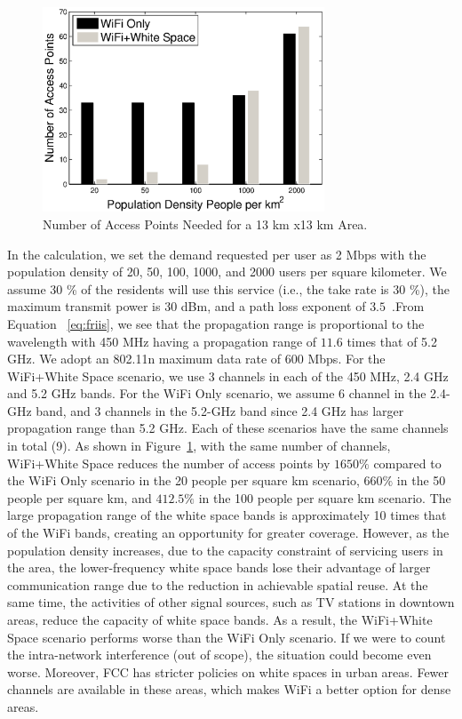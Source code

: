   \begin{figure}
   \centering
   \includegraphics[width=84mm]{figures/redensity}
   \vspace{-0.1in}
   \caption{Number of Access Points Needed for a 13 km x13 km Area.}
   \label{fig:redensity}
   \vspace{-0.3in}
   \end{figure}

In the calculation, we set the demand requested per user as 2 Mbps with the population density of 20, 50, 100, 1000, 
and 2000 users per square kilometer. We assume 30 \% of the residents will use this service (i.e., the take rate is 
30 \%), the maximum transmit power is 30 dBm, and a path loss exponent of $3.5$~\cite{meikle2012global}.From Equation
~\ref{eq:friis}, we see that the propagation range is proportional to the wavelength with 450 MHz having a propagation 
range of $11.6$ times that of 5.2 GHz. We adopt an 802.11n maximum data rate of 600 Mbps. For the WiFi+White Space 
scenario, we use 3 channels in each of the 450 MHz, 2.4 GHz and 5.2 GHz bands. For the WiFi Only scenario, we assume 
6 channel in the 2.4-GHz band, and 3 channels in the 5.2-GHz band since 2.4 GHz has larger propagation range than 5.2 GHz. 
Each of these scenarios have the same channels in total (9). As shown in Figure~\ref{fig:redensity}, with the same number 
of channels, WiFi+White Space reduces the number of access points by $1650\%$ compared to the WiFi Only scenario in the 
20 people per square km scenario, $660\%$ in the 50 people per square km, and $412.5\%$ in the 100 people per square km 
scenario. The large propagation range of the white space bands is approximately 10 times that of the WiFi bands, creating 
an opportunity for greater coverage. However, as the population density increases, due to the capacity constraint of 
servicing users in the area, the lower-frequency white space bands lose their advantage of larger communication range due 
to the reduction in achievable spatial reuse. At the same time, the activities of other signal sources, such as TV stations 
in downtown areas, reduce the capacity of white space bands. As a result, the WiFi+White Space scenario performs worse 
than the WiFi Only scenario. If we were to count the intra-network interference (out of scope), the situation could become 
even worse. Moreover, FCC has stricter policies on white spaces in urban areas. Fewer channels are available in these 
areas, which makes WiFi a better option for dense areas.

